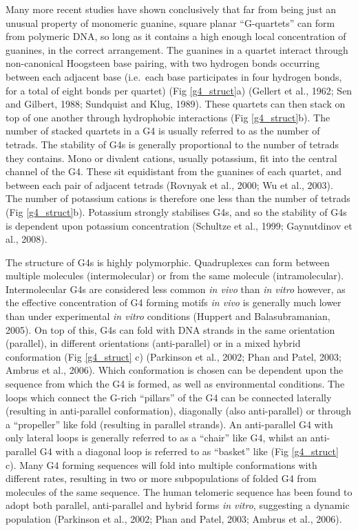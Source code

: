 \documentclass[12pt,a4paper,]{report}
\begin{document}
Many more recent studies have shown conclusively that far from being
just an unusual property of monomeric guanine, square planar
``G-quartets'' can form from polymeric DNA, so long as it contains a
high enough local concentration of guanines, in the correct arrangement.
The guanines in a quartet interact through non-canonical Hoogsteen base
pairing, with two hydrogen bonds occurring between each adjacent base
(i.e.~each base participates in four hydrogen bonds, for a total of
eight bonds per quartet) (Fig \ref{g4_struct}a) (Gellert et al., 1962;
Sen and Gilbert, 1988; Sundquist and Klug, 1989). These quartets can
then stack on top of one another through hydrophobic interactions (Fig
\ref{g4_struct}b). The number of stacked quartets in a G4 is usually
referred to as the number of tetrads. The stability of G4s is generally
proportional to the number of tetrads they contains. Mono or divalent
cations, usually potassium, fit into the central channel of the G4.
These sit equidistant from the guanines of each quartet, and between
each pair of adjacent tetrads (Rovnyak et al., 2000; Wu et al., 2003).
The number of potassium cations is therefore one less than the number of
tetrads (Fig \ref{g4_struct}b). Potassium strongly stabilises G4s, and
so the stability of G4s is dependent upon potassium concentration
(Schultze et al., 1999; Gaynutdinov et al., 2008).

The structure of G4s is highly polymorphic. Quadruplexes can form
between multiple molecules (intermolecular) or from the same molecule
(intramolecular). Intermolecular G4s are considered less common \emph{in
vivo} than \emph{in vitro} however, as the effective concentration of G4
forming motifs \emph{in vivo} is generally much lower than under
experimental \emph{in vitro} conditions (Huppert and Balasubramanian,
2005). On top of this, G4s can fold with DNA strands in the same
orientation (parallel), in different orientations (anti-parallel) or in
a mixed hybrid conformation (Fig \ref{g4_struct} c) (Parkinson et al.,
2002; Phan and Patel, 2003; Ambrus et al., 2006). Which conformation is
chosen can be dependent upon the sequence from which the G4 is formed,
as well as environmental conditions. The loops which connect the G-rich
``pillars'' of the G4 can be connected laterally (resulting in
anti-parallel conformation), diagonally (also anti-parallel) or through
a ``propeller'' like fold (resulting in parallel strands). An
anti-parallel G4 with only lateral loops is generally referred to as a
``chair'' like G4, whilst an anti-parallel G4 with a diagonal loop is
referred to as ``basket'' like (Fig \ref{g4_struct} c). Many G4 forming
sequences will fold into multiple conformations with different rates,
resulting in two or more subpopulations of folded G4 from molecules of
the same sequence. The human telomeric sequence has been found to adopt
both parallel, anti-parallel and hybrid forms \emph{in vitro},
suggesting a dynamic population (Parkinson et al., 2002; Phan and Patel,
2003; Ambrus et al., 2006).
\end{document}
